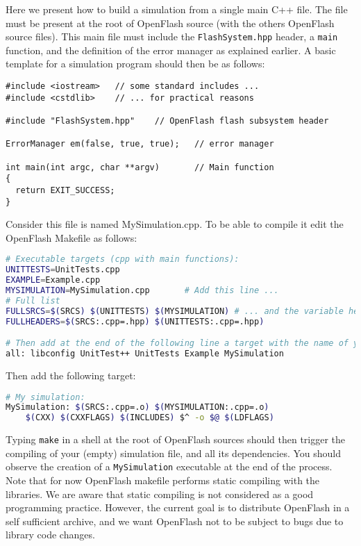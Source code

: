 Here we present how to build a simulation from a single main C++ file. The file must be present at the root of OpenFlash source (with the others OpenFlash source files). This main file must include the \verb+FlashSystem.hpp+ header, a \verb+main+ function, and the definition of the error manager as explained earlier. A basic template for a simulation program should then be as follows:

\begin{lstlisting}
#include <iostream>   // some standard includes ...
#include <cstdlib>    // ... for practical reasons

#include "FlashSystem.hpp"    // OpenFlash flash subsystem header

ErrorManager em(false, true, true);   // error manager

int main(int argc, char **argv)       // Main function
{
  return EXIT_SUCCESS;
}
\end{lstlisting} 

Consider this file is named MySimulation.cpp. To be able to compile it edit the OpenFlash Makefile as follows:

\begin{lstlisting}[language=sh, firstnumber=15]
# Executable targets (cpp with main functions):
UNITTESTS=UnitTests.cpp
EXAMPLE=Example.cpp
MYSIMULATION=MySimulation.cpp       # Add this line ...
# Full list
FULLSRCS=$(SRCS) $(UNITTESTS) $(MYSIMULATION) # ... and the variable here
FULLHEADERS=$(SRCS:.cpp=.hpp) $(UNITTESTS:.cpp=.hpp)

# Then add at the end of the following line a target with the name of your choice:
all: libconfig UnitTest++ UnitTests Example MySimulation
\end{lstlisting}

Then add the following target:

\begin{lstlisting}[language=sh, firstnumber=50]
# My simulation:
MySimulation: $(SRCS:.cpp=.o) $(MYSIMULATION:.cpp=.o)
	$(CXX) $(CXXFLAGS) $(INCLUDES) $^ -o $@ $(LDFLAGS)
\end{lstlisting}

Typing \verb+make+ in a shell at the root of OpenFlash sources should then trigger the compiling of your (empty) simulation file, and all its dependencies. You should observe the creation of a \verb+MySimulation+ executable at the end of the process. Note that for now OpenFlash makefile performs static compiling with the libraries. We are aware that static compiling is not considered as a good programming practice. However, the current goal is to distribute OpenFlash in a self sufficient archive, and we want OpenFlash not to be subject to bugs due to library code changes.

